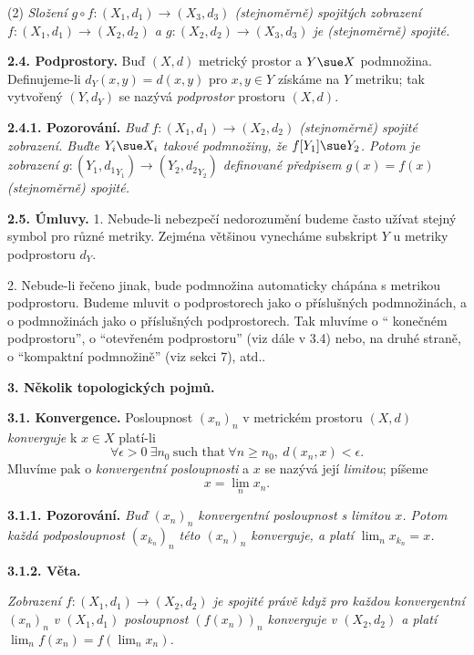 \documentclass[12pt]{article}
\begin{document}
{ (2) {\em Složení $g\circ f:(X_1,d_1)\to(X_3,d_3)$ (stejnoměrně) spojitých zobrazení
  $f:(X_1,d_1)\to(X_2,d_2)$ a  $g:(X_2,d_2)\to(X_3,d_3)$ je (stejnoměrně) spojité.}
  
 

\bigskip

{\bf 2.4. Podprostory.} Buď $(X,d)$ metrický prostor a $Y\sue X$ podmnožina.
Definujeme-li $d_Y(x,y)=d(x,y)$ pro $x,y\in Y$ získáme na $Y$ metriku; tak vytvořený $(Y,d_Y)$
 se nazývá  {\em podprostor} prostoru $(X,d)$.
  
  \medskip
  
  {\bf 2.4.1. Pozorování.} {\em Buď $f:(X_1,d_1)\to(X_2,d_2)$  (stejnoměrně) spojité zobrazení. Buďte $Y_i\sue X_i$ takové podmnožiny, že $f[Y_1]\sue Y_2$. Potom je zobrazení $g:(Y_1,{d_1}_{Y_1})\to(Y_2,{d_2}_{Y_2})$ definované předpisem $g(x)=f(x)$ (stejnoměrně) spojité.}
  
  \bigskip
  
  {\bf 2.5. Úmluvy.} 1. Nebude-li nebezpečí nedorozumění budeme často užívat stejný symbol pro různé metriky. Zejména většinou vynecháme subskript $Y$ u metriky podprostoru $d_Y$.
  
  2. Nebude-li řečeno jinak, bude podmnožina automaticky chápána s metrikou podprostoru. Budeme mluvit o podprostorech jako o příslušných pod\-mno\-žinách, a o podmnožinách jako o příslušných podprostorech. Tak mluvíme o   `` konečném podprostoru'', o ``otevřeném podprostoru'' (viz dále v 3.4) nebo, na druhé straně, o ``kompaktní podmnožině'' (viz sekci  7), atd.. 
  
 \vskip10mm
 
 {\large\bf 3. Několik topologických pojmů.}
  
 \bigskip
 
 
 {\bf 3.1. Konvergence.} Posloupnost $(x_n)_n$ v metrickém prostoru $(X,d)$ {\em konverguje} k $x\in X$ platí-li
 $$
 \forall\epsilon>0\ \exists n_0\ \text{such that}\ \forall n\geq n_0,\ d(x_n,x)<\epsilon.
 $$
 Mluvíme pak o {\em konvergentní posloupnosti} a $x$ se nazývá její {\em limitou}; píšeme
 $$
 x=\lim_n x_n.
 $$
 
 \medskip
 
 {\bf 3.1.1. Pozorování.} {\em Buď $(x_n)_n$ konvergentní posloupnost s limitou $x$.  Potom každá podposloupnost $(x_{k_n})_n$ této $(x_n)_n$ konverguje, a platí $\lim_nx_{k_n}=x$.}
 
 \medskip

 {\bf 3.1.2. Věta.} {\em Zobrazení $f:(X_1,d_1)\to (X_2,d_2)$ je spojité právě když pro každou konvergentní  $(x_n)_n$ v $(X_1,d_1)$ posloupnost $(f(x_n))_n$ konverguje v $(X_2,d_2)$ a  platí
 $\lim_nf(x_n)=f(\lim_nx_n)$.
 
}}
\end{document}
